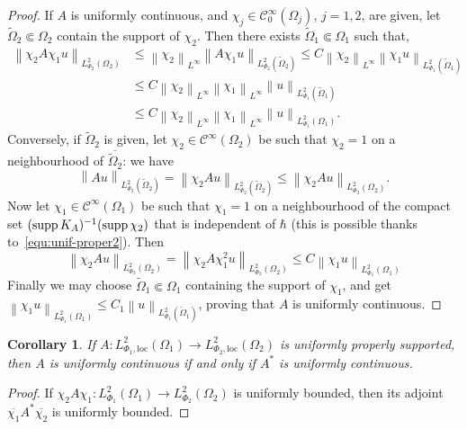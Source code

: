 \documentclass{article}
\newtheorem{coro}{Corollary}[theo]
\newcommand{\loc}{\mathrm{loc}}
\newcommand{\norm}[1]{\left\|#1\right\|}
\newcommand{\Cinf}{\mathscr{C}^\infty}
\newcommand{\spt}{\mathop{\textup{supp}}}
\newcommand{\h}{\hbar}
\begin{document}
\begin{proof}
  If $A$ is uniformly continuous, and $\chi_j\in\Cinf_0(\Omega_j)$,
  $j=1,2$, are given, let $\tilde\Omega_2\Subset\Omega_2$ contain the
  support of $\chi_2$. Then there exists
  $\tilde\Omega_1\Subset\Omega_1$ such that,
  \begin{align}
    \norm{\chi_2 A \chi_1 u}_{L^2_{\Phi_2}(\Omega_2)} 
    & 
      \leq
      \norm{\chi_2}_{L^\infty}\norm{A \chi_1 u}_{L^2_{\Phi_2}(\tilde
      \Omega_2)} \leq C\norm{\chi_2}_{L^\infty}\norm{\chi_1
      u}_{L^2_{\Phi_1}(\tilde \Omega_1)} \\
    &
      \leq C\norm{\chi_2}_{L^\infty}\norm{\chi_1}_{L^\infty}\norm{
      u}_{L^2_{\Phi_1}(\tilde \Omega_1)} \\
    &
      \leq  C\norm{\chi_2}_{L^\infty}\norm{\chi_1}_{L^\infty}\norm{
      u}_{L^2_{\Phi_1}(\Omega_1)}.
  \end{align}
  Conversely, if $\tilde\Omega_2$ is given, let
  $\chi_2\in\Cinf(\Omega_2)$ be such that $\chi_2 = 1$ on a
  neighbourhood of $\overline{\tilde\Omega_2}$: we have
  \[
  \norm{A u}_{L^2_{\Phi_2}(\tilde \Omega_2)} = \norm{\chi_2 A
    u}_{L^2_{\Phi_2}(\tilde \Omega_2)} \leq \norm{\chi_2 A
    u}_{L^2_{\Phi_2}(\Omega_2)}.
  \]
  Now let $\chi_1\in\Cinf(\Omega_1)$ be such that $\chi_1 = 1$ on
  a neighbourhood of the compact set $(\spt K_A)^{-1}(\spt \chi_2)$
  that is independent of $\h$ (this is possible thanks
  to~\eqref{equ:unif-proper2}). Then
  \[
  \norm{\chi_2 A u}_{L^2_{\Phi_2}(\Omega_2)} = \norm{\chi_2 A \chi_1^2
    u}_{L^2_{\Phi_2}( \Omega_2)} \leq C \norm{\chi_1 u}_{L^2_{\Phi_1}(
    \Omega_1)}
  \]
  Finally we may choose $\tilde\Omega_1\Subset\Omega_1$ containing the
  support of $\chi_1$, and get
  $\norm{\chi_1 u}_{L^2_{\Phi_1}( \Omega_1)} \leq C_1
  \norm{u}_{L^2_{\Phi_1}( \tilde\Omega_1)} $,
  proving that $A$ is uniformly continuous.
\end{proof}
\begin{coro}
  If
  $A:L_{ \Phi_1,\loc}^{2}(\Omega_1) \to L_{
    \Phi_2,\loc}^{2}(\Omega_2)$
  is uniformly properly supported, then $A$ is uniformly continuous if
  and only if $A^*$ is uniformly continuous.
\end{coro}
\begin{proof}
  If
  $\chi_2 A \chi_1: L^2_{\Phi_1}(\Omega_1)\to L^2_{\Phi_2}(\Omega_2)$
  is uniformly bounded, then its adjoint
  $\overline{\chi_1}A^*\overline{\chi_2}$ is uniformly bounded.
\end{proof}
\end{document}
